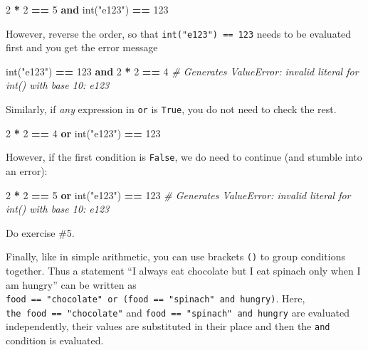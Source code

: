\documentclass[
]{book}
\newenvironment{Shaded}{\begin{snugshade}}{\end{snugshade}}
\newcommand{\BuiltInTok}[1]{#1}
\newcommand{\CommentTok}[1]{\textcolor[rgb]{0.56,0.35,0.01}{\textit{#1}}}
\newcommand{\DecValTok}[1]{\textcolor[rgb]{0.00,0.00,0.81}{#1}}
\newcommand{\KeywordTok}[1]{\textcolor[rgb]{0.13,0.29,0.53}{\textbf{#1}}}
\newcommand{\NormalTok}[1]{#1}
\newcommand{\OperatorTok}[1]{\textcolor[rgb]{0.81,0.36,0.00}{\textbf{#1}}}
\newcommand{\StringTok}[1]{\textcolor[rgb]{0.31,0.60,0.02}{#1}}
\begin{document}
\begin{Shaded}
\begin{Highlighting}[]
\DecValTok{2} \OperatorTok{*} \DecValTok{2} \OperatorTok{==} \DecValTok{5} \KeywordTok{and} \BuiltInTok{int}\NormalTok{(}\StringTok{"e123"}\NormalTok{) }\OperatorTok{==} \DecValTok{123}
\end{Highlighting}
\end{Shaded}

However, reverse the order, so that \texttt{int("e123")\ ==\ 123} needs to be evaluated first and you get the error message

\begin{Shaded}
\begin{Highlighting}[]
\BuiltInTok{int}\NormalTok{(}\StringTok{"e123"}\NormalTok{) }\OperatorTok{==} \DecValTok{123} \KeywordTok{and} \DecValTok{2} \OperatorTok{*} \DecValTok{2} \OperatorTok{==} \DecValTok{4}
\CommentTok{\# Generates ValueError: invalid literal for int() with base 10: \textquotesingle{}e123\textquotesingle{}}
\end{Highlighting}
\end{Shaded}

Similarly, if \emph{any} expression in \texttt{or} is \texttt{True}, you do not need to check the rest.

\begin{Shaded}
\begin{Highlighting}[]
\DecValTok{2} \OperatorTok{*} \DecValTok{2} \OperatorTok{==} \DecValTok{4} \KeywordTok{or} \BuiltInTok{int}\NormalTok{(}\StringTok{"e123"}\NormalTok{) }\OperatorTok{==} \DecValTok{123}
\end{Highlighting}
\end{Shaded}

However, if the first condition is \texttt{False}, we do need to continue (and stumble into an error):

\begin{Shaded}
\begin{Highlighting}[]
\DecValTok{2} \OperatorTok{*} \DecValTok{2} \OperatorTok{==} \DecValTok{5} \KeywordTok{or} \BuiltInTok{int}\NormalTok{(}\StringTok{"e123"}\NormalTok{) }\OperatorTok{==} \DecValTok{123}
\CommentTok{\# Generates ValueError: invalid literal for int() with base 10: \textquotesingle{}e123\textquotesingle{}}
\end{Highlighting}
\end{Shaded}

Do exercise \#5.

Finally, like in simple arithmetic, you can use brackets \texttt{()} to group conditions together. Thus a statement ``I always eat chocolate but I eat spinach only when I am hungry'' can be written as \texttt{food\ ==\ "chocolate"\ or\ (food\ ==\ "spinach"\ and\ hungry)}. Here, \texttt{the\ food\ ==\ "chocolate"} and \texttt{food\ ==\ "spinach"\ and\ hungry} are evaluated independently, their values are substituted in their place and then the \texttt{and} condition is evaluated.
\end{document}

